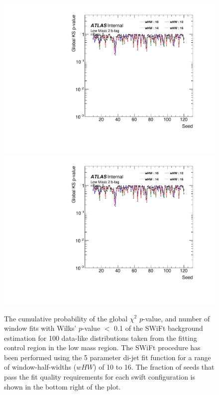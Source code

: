 \begin{figure}[!htb]
\captionsetup[subfigure]{aboveskip=0pt,justification=centering}
\centering
{} {
  \includegraphics[width=0.49\linewidth, angle=0,page=7]{figs/Dibjet/LowMass/FitStudy/windowSel_corrFitCR_dataLike_5para.pdf}
}  \hspace{-8mm}
 {
  \includegraphics[width=0.49\linewidth, angle=0,page=9]{figs/Dibjet/LowMass/FitStudy/windowSel_corrFitCR_dataLike_5para.pdf}
}
\vspace{10pt}
\caption{\label{fig:windowSel_dataLike}
  The cumulative probability of the global $\chi^{2}$ $p$-value, %
  and number of window fits with Wilks' $p$-value $<$ 0.1 of the SWiFt background estimation for
  100 data-like distributions taken from the fitting control region in the low mass region.
  The SWiFt procedure has been performed using the 5 parameter di-jet fit function
  for a range of window-half-widths ($wHW$) of 10 to 16.
  The fraction of seeds that pass the fit quality requirements for each swift configuration is shown in the bottom right of the plot.
}
\end{figure}


